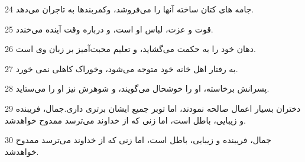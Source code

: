 \par 24 جامه های کتان ساخته آنها را می‌فروشد، وکمربندها به تاجران می‌دهد.
\par 25 قوت و عزت، لباس او است، و درباره وقت آینده می‌خندد.
\par 26 دهان خود را به حکمت می‌گشاید، و تعلیم محبت‌آمیز بر زبان وی است.
\par 27 به رفتار اهل خانه خود متوجه می‌شود، وخوراک کاهلی نمی خورد.
\par 28 پسرانش برخاسته، او را خوشحال می‌گویند، و شوهرش نیز او را می‌ستاید.
\par 29 دختران بسیار اعمال صالحه نمودند، اما توبر جمیع ایشان برتری داری.جمال، فریبنده و زیبایی، باطل است، اما زنی که از خداوند می‌ترسد ممدوح خواهدشد.
\par 30 جمال، فریبنده و زیبایی، باطل است، اما زنی که از خداوند می‌ترسد ممدوح خواهدشد.

